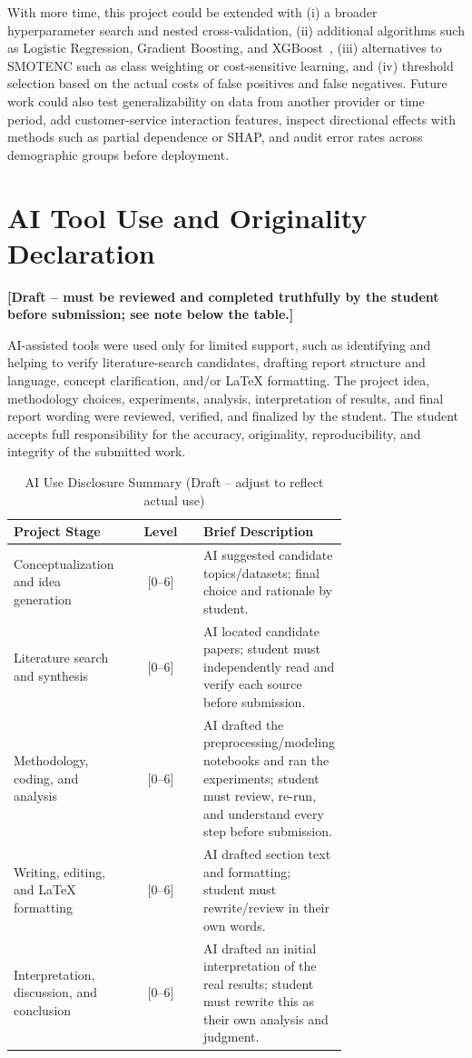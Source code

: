 \documentclass[conference]{IEEEtran}
\begin{document}
	With more time, this project could be extended with (i) a broader hyperparameter search and nested cross-validation, (ii) additional algorithms such as Logistic Regression, Gradient Boosting, and XGBoost~\cite{b1}, (iii) alternatives to SMOTENC such as class weighting or cost-sensitive learning, and (iv) threshold selection based on the actual costs of false positives and false negatives. Future work could also test generalizability on data from another provider or time period, add customer-service interaction features, inspect directional effects with methods such as partial dependence or SHAP, and audit error rates across demographic groups before deployment.
	
	\section*{AI Tool Use and Originality Declaration}
	\label{sec:ai_declaration}
	
	\textbf{[Draft -- must be reviewed and completed truthfully by the student before submission; see note below the table.]}
	
	AI-assisted tools were used only for limited support, such as identifying and helping to verify literature-search candidates, drafting report structure and language, concept clarification, and/or LaTeX formatting. The project idea, methodology choices, experiments, analysis, interpretation of results, and final report wording were reviewed, verified, and finalized by the student. The student accepts full responsibility for the accuracy, originality, reproducibility, and integrity of the submitted work.
	
	\begin{table}[htbp]
		\caption{AI Use Disclosure Summary (Draft -- adjust to reflect actual use)}
		\label{tab:ai_use}
		\centering
		\footnotesize
		\begin{tabular}{|p{0.35\linewidth}|c|p{0.38\linewidth}|}
			\hline
			\textbf{Project Stage} & \textbf{Level} & \textbf{Brief Description} \\
			\hline
			Conceptualization and idea generation & [0--6] & AI suggested candidate topics/datasets; final choice and rationale by student. \\
			\hline
			Literature search and synthesis & [0--6] & AI located candidate papers; student must independently read and verify each source before submission. \\
			\hline
			Methodology, coding, and analysis & [0--6] & AI drafted the preprocessing/modeling notebooks and ran the experiments; student must review, re-run, and understand every step before submission. \\
			\hline
			Writing, editing, and LaTeX formatting & [0--6] & AI drafted section text and formatting; student must rewrite/review in their own words. \\
			\hline
			Interpretation, discussion, and conclusion & [0--6] & AI drafted an initial interpretation of the real results; student must rewrite this as their own analysis and judgment. \\
			\hline
		\end{tabular}
	\end{table}
	
\end{document}
